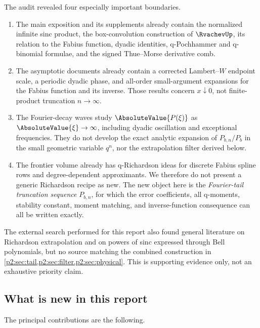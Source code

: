\documentclass[11pt,oneside]{article}
\numberwithin{equation}{section}
\theoremstyle{definition}
\theoremstyle{remark}
\begin{document}
The audit revealed four especially important boundaries.

\begin{enumerate}[label=\textbf{B\arabic*.},leftmargin=12mm]
\item The main exposition and its supplements already contain the normalized
infinite sinc product, the box-convolution construction of \(\RvachevUp\), its relation
to the Fabius function, dyadic identities, q-Pochhammer and q-binomial formulae,
and the signed Thue--Morse derivative comb.

\item The asymptotic documents already contain a corrected Lambert--\(W\)
endpoint scale, a periodic dyadic phase, and all-order small-argument expansions
for the Fabius function and its inverse. Those results concern
\(x\downarrow0\), not finite-product truncation \(n\to\infty\).

\item The Fourier-decay waves study \(\AbsoluteValue{P(\xi)}\) as
\(\AbsoluteValue{\xi}\to\infty\), including dyadic oscillation and exceptional
frequencies. They do not develop the exact analytic expansion of
\(P_{b,n}/P_b\) in the small geometric variable \(q^n\), nor the extrapolation
filter derived below.

\item The frontier volume already has q-Richardson ideas for discrete Fabius
spline rows and degree-dependent approximants. We therefore do not present a
generic Richardson recipe as new. The new object here is the \emph{Fourier-tail
truncation sequence} \(P_{b,n}\), for which the error coefficients, all q-moments,
stability constant, moment matching, and inverse-function consequence can all be
written exactly.
\end{enumerate}

The external search performed for this report also found general literature on
Richardson extrapolation and on powers of sinc expressed through Bell
polynomials, but no source matching the combined construction in
\cref{p2:sec:tail,p2:sec:filter,p2:sec:physical}. This is supporting evidence only, not an
exhaustive priority claim.

\subsection{What is new in this report}

The principal contributions are the following.
\end{document}
